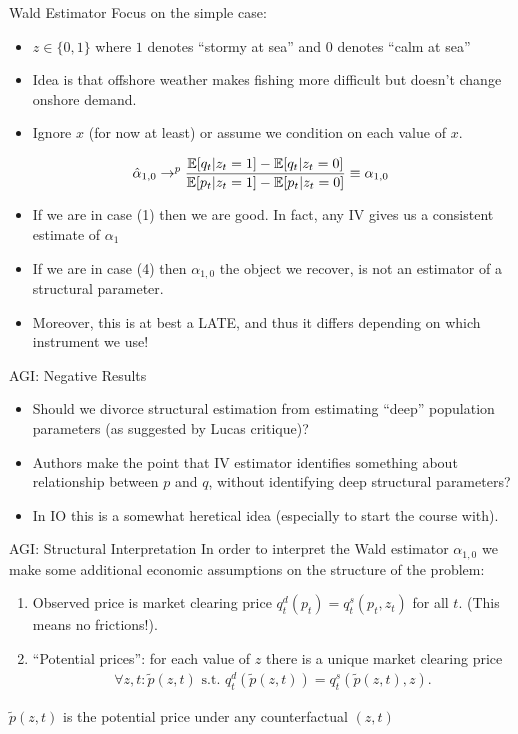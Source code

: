\begin{frame}{Wald Estimator}
Focus on the simple case:
\begin{itemize}
\item $z \in \{0,1\}$ where $1$ denotes ``stormy at sea'' and 0 denotes ``calm at sea''
\item Idea is that offshore weather makes fishing more difficult but doesn't change onshore demand.
\item Ignore $x$ (for now at least) or assume we condition on each value of $x$.
\end{itemize}
\begin{eqnarray*}
\hat{\alpha}_{1,0}  \rightarrow^p \frac{\mathbb{E}[q_t | z_t=1] - \mathbb{E}[q_t | z_t=0]}{\mathbb{E}[p_t | z_t=1] - \mathbb{E}[p_t | z_t =0]} \equiv \alpha_{1,0}
\end{eqnarray*}
\begin{itemize}
\item If we are in case (1) then we are good. In fact, any IV gives us a consistent estimate of $\alpha_1$
\item If we are in case (4) then $\alpha_{1,0}$ the object we recover, is not an estimator of a structural parameter.
\item Moreover, this is at best a LATE, and thus it differs depending on which instrument we use!
\end{itemize}
\end{frame}


\begin{frame}{AGI: Negative Results}
\begin{itemize}
\item Should we divorce structural estimation from estimating ``deep'' population parameters (as suggested by Lucas critique)?
\item Authors make the point that IV estimator identifies something about relationship between $p$ and $q$, without identifying deep structural parameters?
\item In IO this is a somewhat heretical idea (especially to start the course with).
\end{itemize}
\end{frame}

\begin{frame}{AGI: Structural Interpretation}
In order to interpret the Wald estimator $\alpha_{1,0}$ we make some additional \alert{economic} assumptions on the structure of the problem:
\begin{enumerate}
\item Observed price is market clearing price $q_t^d(p_t) = q_t^s(p_t,z_t)$ for all $t$. (This means no frictions!).
\item ``Potential prices'': for each value of $z$ there is a unique market clearing price
\begin{eqnarray*}
\forall z,t : \tilde{p}(z,t) \mbox{ s.t. } q_t^d(\tilde{p}(z,t)) = q_t^s(\tilde{p}(z,t),z).
\end{eqnarray*}
\end{enumerate}
$\tilde{p}(z,t)$ is the potential price under any counterfactual $(z,t)$
\end{frame}


